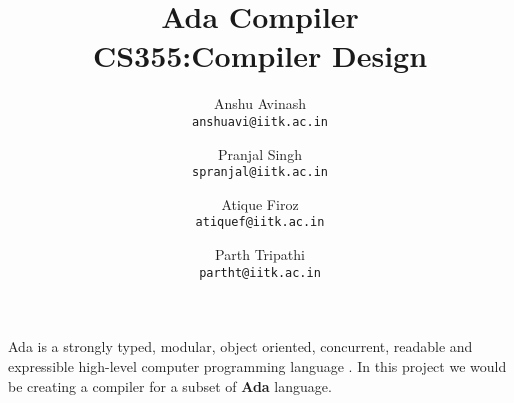 \documentclass{article}
\title{
Ada Compiler \\
CS355:Compiler Design
}
\author{
Anshu Avinash\\
\texttt{anshuavi@iitk.ac.in}
\and
Pranjal Singh\\
\texttt{spranjal@iitk.ac.in}
\and
Atique Firoz\\
\texttt{atiquef@iitk.ac.in}
\and
Parth Tripathi\\
\texttt{partht@iitk.ac.in}
}
\begin{document}
\maketitle
Ada is a strongly typed, modular, object oriented, concurrent, readable and expressible high-level computer programming language \cite{AdaIC}. In this project we would be creating a compiler for a subset of \textbf{Ada} language.
\printbibliography
\end{document}
